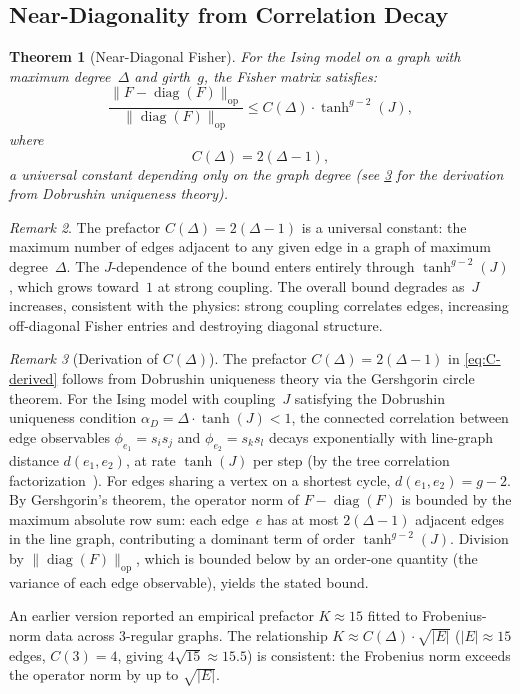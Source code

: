 \documentclass[11pt]{article}
\newtheorem{theorem}{Theorem}[section]
\theoremstyle{definition}
\theoremstyle{remark}
\newtheorem{remark}[theorem]{Remark}
\begin{document}
\subsection{Near-Diagonality from Correlation Decay}

\begin{theorem}[Near-Diagonal Fisher]
\label{thm:near-diagonal}
For the Ising model on a graph with maximum degree~$\Delta$ and girth~$g$,
the Fisher matrix satisfies:
\begin{equation}
  \frac{\|F - \operatorname{diag}(F)\|_{\mathrm{op}}}
       {\|\operatorname{diag}(F)\|_{\mathrm{op}}}
  \leq C(\Delta) \cdot \tanh^{g-2}(J),
  \label{eq:near-diagonal}
\end{equation}
where
\begin{equation}
  C(\Delta) = 2(\Delta - 1),
  \label{eq:C-derived}
\end{equation}
a universal constant depending only on the graph degree
(see \cref{rem:K-derived} for the derivation from Dobrushin uniqueness theory).
\end{theorem}

\begin{remark}
The prefactor $C(\Delta) = 2(\Delta - 1)$ is a universal constant:
the maximum number of edges adjacent to any given edge in a graph of
maximum degree~$\Delta$. The $J$-dependence of the bound enters entirely
through $\tanh^{g-2}(J)$, which grows toward~$1$ at strong coupling.
The overall bound degrades as~$J$ increases, consistent with the physics:
strong coupling correlates edges, increasing off-diagonal Fisher entries
and destroying diagonal structure.
\end{remark}

\begin{remark}[Derivation of $C(\Delta)$]
\label{rem:K-derived}
The prefactor $C(\Delta) = 2(\Delta - 1)$ in \cref{eq:C-derived} follows from
Dobrushin uniqueness theory via the Gershgorin circle theorem.
For the Ising model with coupling~$J$ satisfying the Dobrushin uniqueness
condition $\alpha_D = \Delta \cdot \tanh(J) < 1$, the connected
correlation between edge observables $\phi_{e_1} = s_i s_j$ and
$\phi_{e_2} = s_k s_l$ decays exponentially with line-graph distance
$d(e_1, e_2)$, at rate $\tanh(J)$ per step
(by the tree correlation factorization~\cite{Dobrushin1985}).
For edges sharing a vertex on a shortest cycle, $d(e_1, e_2) = g - 2$.
By Gershgorin's theorem, the operator norm of $F - \operatorname{diag}(F)$
is bounded by the maximum absolute row sum:
each edge~$e$ has at most $2(\Delta - 1)$ adjacent edges in the line graph,
contributing a dominant term of order $\tanh^{g-2}(J)$.
Division by $\|\operatorname{diag}(F)\|_{\mathrm{op}}$, which is bounded
below by an order-one quantity (the variance of each edge observable),
yields the stated bound.

An earlier version reported an empirical prefactor $K \approx 15$
fitted to Frobenius-norm data across 3-regular graphs.
The relationship $K \approx C(\Delta) \cdot \sqrt{|E|}$
($|E| \approx 15$ edges, $C(3) = 4$, giving $4\sqrt{15} \approx 15.5$)
is consistent: the Frobenius norm exceeds the operator norm by up to
$\sqrt{|E|}$.
\end{remark}
\end{document}
